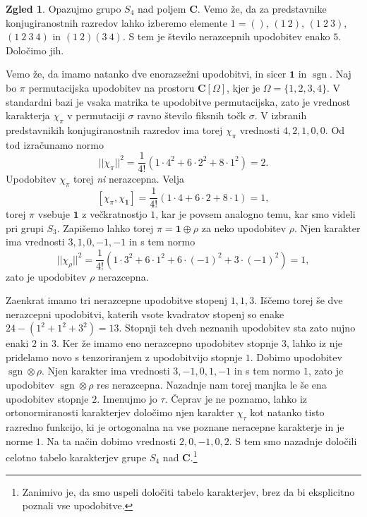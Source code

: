 \documentclass[11pt]{book}
\def\CC{\mathbf{C}}
\def\11{\mathbf{1}}
\DeclareMathOperator\sgn{sgn}
\theoremstyle{definition}
\theoremstyle{zgled}
\newtheorem*{zgled}{Zgled}
\theoremstyle{odprtproblem}
\theoremstyle{domacanaloga}
\theoremstyle{izrek}
\begin{document}
\begin{zgled}
Opazujmo grupo $S_4$ nad poljem $\CC$. Vemo že, da za predstavnike konjugiranostnih razredov lahko izberemo elemente $1 = ()$, $(1 \ 2)$, $(1 \ 2 \ 3)$, $(1 \ 2 \ 3 \ 4)$ in $(1 \ 2)(3 \ 4)$. S tem je število nerazcepnih upodobitev enako $5$. Določimo jih. 

Vemo že, da imamo natanko dve enorazsežni upodobitvi, in sicer $\11$ in $\sgn$. Naj bo $\pi$ permutacijska upodobitev na prostoru $\CC[\Omega]$, kjer je $\Omega = \{ 1,2,3,4 \}$. V standardni bazi je vsaka matrika te upodobitve permutacijska, zato je vrednost karakterja $\chi_{\pi}$ v permutaciji $\sigma$ ravno število fiksnih točk $\sigma$. V izbranih predstavnikih konjugiranostnih razredov ima torej $\chi_{\pi}$ vrednosti $4, 2, 1, 0, 0$. Od tod izračunamo normo
\[
    ||\chi_{\pi}||^2 = \frac{1}{4!} \left( 1 \cdot 4^2 + 6 \cdot 2^2 + 8 \cdot 1^2  \right)
    = 2.
\]
Upodobitev $\chi_{\pi}$ torej \emph{ni} nerazcepna. Velja
\[
    [ \chi_{\pi}, \chi_{\11} ] = \frac{1}{4!} \left( 1 \cdot 4 + 6 \cdot 2 + 8 \cdot 1 \right) = 1,
\]
torej $\pi$ vsebuje $\11$ z večkratnostjo $1$, kar je povsem analogno temu, kar smo videli pri grupi $S_3$. Zapišemo lahko torej $\pi = \11 \oplus \rho$ za neko upodobitev $\rho$. Njen karakter ima vrednosti $3,1,0,-1,-1$ in s tem normo
\[
    ||\chi_{\rho}||^2 = \frac{1}{4!} \left( 1 \cdot 3^2 + 6 \cdot 1^2 + 6 \cdot (-1)^2 + 3 \cdot (-1)^2 \right) = 1,
\]
zato je upodobitev $\rho$ nerazcepna. 

Zaenkrat imamo tri nerazcepne upodobitve stopenj $1,1,3$. Iščemo torej še dve nerazcepni upodobitvi, katerih vsote kvadratov stopenj so enake $24 - (1^2 + 1^2 + 3^2) = 13$. Stopnji teh dveh neznanih upodobitev sta zato nujno enaki $2$ in $3$. Ker že imamo eno nerazcepno upodobitev stopnje $3$, lahko iz nje pridelamo novo s tenzoriranjem z upodobitvijo stopnje $1$. Dobimo upodobitev $\sgn \otimes \rho$. Njen karakter ima vrednosti $3,-1,0,1,-1$ in s tem normo $1$, zato je upodobitev $\sgn \otimes \rho$ res nerazcepna. Nazadnje nam torej manjka le še ena upodobitev stopnje $2$. Imenujmo jo $\tau$. Čeprav je ne poznamo, lahko iz ortonormiranosti karakterjev določimo njen karakter $\chi_{\tau}$ kot natanko tisto razredno funkcijo, ki je ortogonalna na vse poznane neracepne karakterje in je norme $1$. Na ta način dobimo vrednosti $2,0,-1,0,2$. S tem smo nazadnje določili celotno tabelo karakterjev grupe $S_4$ nad $\CC$.\footnote{Zanimivo je, da smo uspeli določiti tabelo karakterjev, brez da bi eksplicitno poznali vse upodobitve. }


\end{zgled}
\end{document}
